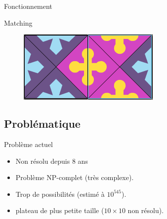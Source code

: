 	\begin{frame}{Fonctionnement}
		\begin{Bblock}{Matching}
			\begin{figure}
				\includegraphics[width=0.5\linewidth]{images/matching_pieces}
			\end{figure}
		\end{Bblock}
	\end{frame}

	\subsection{Problématique}
	
	\begin{frame}{Problème actuel}
		\begin{itemize}[<+->]
			\item Non résolu depuis 8 ans
			\item Problème NP-complet (très complexe).
			\item Trop de possibilités (estimé à $10^{545}$).
			\item plateau de plus petite taille ($10\times 10$ non résolu).
		\end{itemize}
	\end{frame}